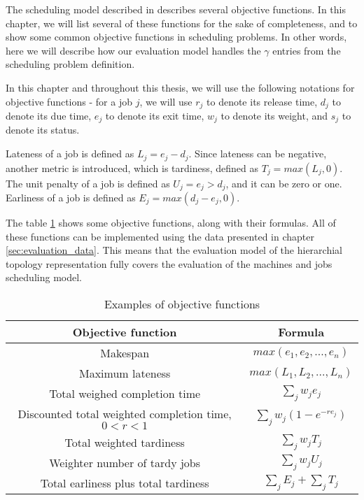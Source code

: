 The scheduling model described in \citep{pinedo2016scheduling} describes several objective functions. In this chapter, we will list several of these functions for the sake of completeness, and to show some common objective functions in scheduling problems. In other words, here we will describe how our evaluation model handles the $ \gamma $ entries from the scheduling problem definition.

In this chapter and throughout this thesis, we will use the following notations for objective functions - for a job $j$, we will use $r_j$ to denote its release time, $d_j$ to denote its due time, $e_j$ to denote its exit time, $w_j$ to denote its weight, and $s_j$ to denote its status.

Lateness of a job is defined as $L_j = e_j - d_j$. Since lateness can be negative, another metric is introduced, which is tardiness, defined as $T_j = max(L_j, 0)$. The unit penalty of a job is defined as $U_j = e_j > d_j$, and it can be zero or one. Earliness of a job is defined as $E_j = max(d_j - e_j, 0)$.

The table \ref{tab:objective_functions_table} shows some objective functions, along with their formulas. All of these functions can be implemented using the data presented in chapter \ref{sec:evaluation_data}. This means that the evaluation model of the hierarchial topology representation fully covers the evaluation of the machines and jobs scheduling model.

\begin{table}[!htbp]
    \begin{center}
        \begin{tabular}{|c|c|} 
         \hline
         Objective function & Formula \\ [0.5ex] 
         \hline\hline
         Makespan & $ max(e_1, e_2, ..., e_n) $ \\ 
         \hline
         Maximum lateness & $  max(L_1, L_2, ..., L_n) $ \\ 
         \hline
         Total weighed completion time & $ \sum_{j} w_j e_j $ \\ 
         \hline
         Discounted total weighted completion time, $ 0 < r < 1$ & $ \sum_{j} w_j (1 - e^{-r e_j}) $ \\ 
         \hline
         Total weighted tardiness & $ \sum_{j} w_j T_j $ \\ 
         \hline
         Weighter number of tardy jobs & $ \sum_{j} w_j U_j $ \\ 
         \hline
         Total earliness plus total tardiness & $ \sum_{j} E_j + \sum_{j} T_j $ \\ 
         \hline
        \end{tabular}
        \end{center}
        \caption{Examples of objective functions}
    \label{tab:objective_functions_table}
    \end{table}

